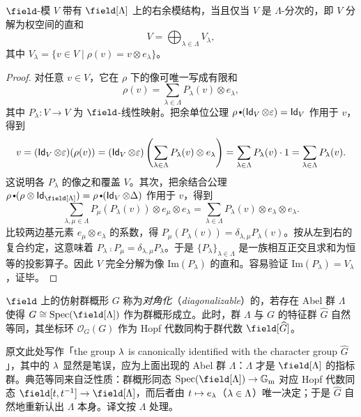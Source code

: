 \begin{prop}
\label{prop:WeightSpaceDecompositionForComodule}
$\field$-模 $V$ 带有 $\field[\Lambda]$ 上的右余模结构，当且仅当 $V$ 是 $\Lambda$-分次的，即 $V$ 分解为权空间的直和
$$
V = \bigoplus_{\lambda \in \Lambda} V_\lambda,
$$
其中 $V_\lambda = \{v \in V \mid \rho(v) = v \otimes e_\lambda\}$。
\end{prop}

\begin{proof}
对任意 $v \in V$，它在 $\rho$ 下的像可唯一写成有限和
$$
\rho(v) = \sum_{\lambda \in \Lambda} P_\lambda(v) \otimes e_\lambda,
$$
其中 $P_\lambda : V \rightarrow V$ 为 $\field$-线性映射。把余单位公理 $\rho \comp (\id_V \otimes \varepsilon) = \id_V$ 作用于 $v$，得到
$$
v = (\operatorname{\mathsf{Id}}_V \otimes \varepsilon)(\rho(v)) = (\operatorname{\mathsf{Id}}_V \otimes \varepsilon)\left(\sum_{\lambda \in \Lambda} P_\lambda(v) \otimes e_\lambda\right) = \sum_{\lambda \in \Lambda} P_\lambda(v) \cdot 1 = \sum_{\lambda \in \Lambda} P_\lambda(v).
$$
这说明各 $P_\lambda$ 的像之和覆盖 $V$。其次，把余结合公理
$
\rho \comp (\rho \otimes \id_{\field[\Lambda]}) = \rho \comp (\id_V \otimes \Delta)
$
作用于 $v$，得到
$$
\sum_{\lambda, \mu \in \Lambda} P_\mu(P_\lambda(v)) \otimes e_\mu \otimes e_\lambda = \sum_{\lambda \in \Lambda} P_\lambda(v) \otimes e_\lambda \otimes e_\lambda.
$$
比较两边基元素 $e_\mu \otimes e_\lambda$ 的系数，得 $P_\mu(P_\lambda(v)) = \delta_{\lambda, \mu} P_\lambda(v)$。按从左到右的复合约定，这意味着 $P_\lambda \comp P_\mu = \delta_{\lambda, \mu} P_\lambda$。于是 $\{P_\lambda\}_{\lambda \in \Lambda}$ 是一族相互正交且求和为恒等的投影算子。因此 $V$ 完全分解为像 $\mathrm{Im}(P_\lambda)$ 的直和。容易验证 $\mathrm{Im}(P_\lambda) = V_\lambda$，证毕。
\end{proof}

\begin{defn}[对角化群概形]
$\field$ 上的仿射群概形 $G$ 称为\emph{对角化}（\emph{diagonalizable}）的，若存在 Abel 群 $\Lambda$ 使得
$G\cong\Spec(\field[\Lambda])$
作为群概形成立。此时，群 $\Lambda$ 与 $G$ 的特征群 $\widehat{G}$ 自然等同，其坐标环 $\mathcal{O}_G(G)$ 作为 Hopf 代数同构于群代数 $\field[\widehat{G}]$。
\end{defn}

\begin{yizhu}
原文此处写作「the group $\operatorname{\lambda}$ is canonically identified with the character group $\widehat{G}$」，其中的 $\operatorname{\lambda}$ 显然是笔误，应为上面出现的 Abel 群 $\Lambda$：$\Lambda$ 才是 $\field[\Lambda]$ 的指标群。典范等同来自泛性质：群概形同态 $\Spec(\field[\Lambda])\rightarrow\Gm$ 对应 Hopf 代数同态 $\field[t,t^{-1}]\rightarrow\field[\Lambda]$，而后者由 $t\mapsto e_{\operatorname{\lambda}}$（$\operatorname{\lambda}\in\Lambda$）唯一决定；于是 $\widehat{G}$ 自然地重新认出 $\Lambda$ 本身。译文按 $\Lambda$ 处理。
\end{yizhu}

